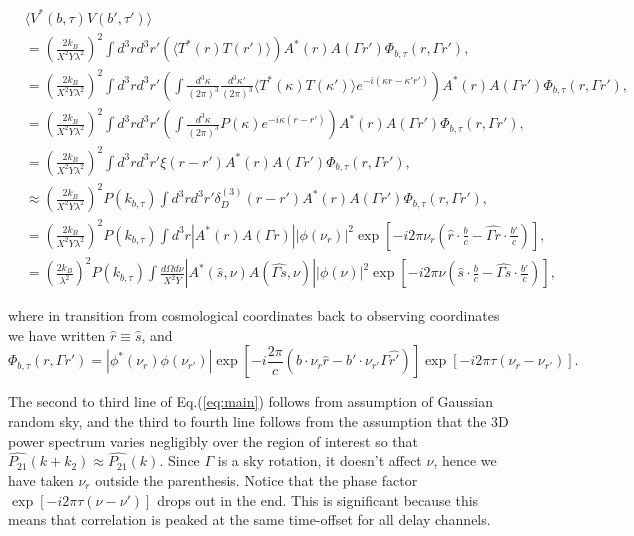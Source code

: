 \documentclass[preprint2,numberedappendix,tighten,twocolappendix]{aastex6}  %
\renewcommand\[{\begin{equation}}
\renewcommand\]{\end{equation}}
\begin{document}
\begin{widetext}
\begin{equation}
\begin{aligned} & \langle V^{*}(b,\tau)V(b',\tau')\rangle\\
 & =\left(\frac{2k_{B}}{X^{2}Y\lambda^{2}}\right)^{2}\int d^{3}rd^{3}r'\left(\langle T^{*}(r)T(r')\rangle\right)A^{*}(r)A(\Gamma r')\Phi_{b,\tau}(r,\Gamma r'),\\
 & =\left(\frac{2k_{B}}{X^{2}Y\lambda^{2}}\right)^{2}\int d^{3}rd^{3}r'\left(\int\frac{d^{3}\kappa}{(2\pi)^{3}}\frac{d^{3}\kappa'}{(2\pi)^{3}}\langle T^{*}(\kappa)T(\kappa')\rangle e^{-i(\kappa r-\kappa'r')}\right)A^{*}(r)A(\Gamma r')\Phi_{b,\tau}(r,\Gamma r'),\\
 & =\left(\frac{2k_{B}}{X^{2}Y\lambda^{2}}\right)^{2}\int d^{3}rd^{3}r'\left(\int\frac{d^{3}\kappa}{(2\pi)^{3}}P(\kappa)e^{-i\kappa(r-r')}\right)A^{*}(r)A(\Gamma r')\Phi_{b,\tau}(r,\Gamma r'),\\
 & =\left(\frac{2k_{B}}{X^{2}Y\lambda^{2}}\right)^{2}\int d^{3}rd^{3}r'\xi(r-r')A^{*}(r)A(\Gamma r')\Phi_{b,\tau}(r,\Gamma r'),\\
 & \approx\left(\frac{2k_{B}}{X^{2}Y\lambda^{2}}\right)^{2}P(k_{b,\tau})\int d^{3}rd^{3}r'\delta_{D}^{(3)}(r-r')A^{*}(r)A(\Gamma r')\Phi_{b,\tau}(r,\Gamma r'),\\
 & =\left(\frac{2k_{B}}{X^{2}Y\lambda^{2}}\right)^{2}P(k_{b,\tau})\int d^{3}r|A^{*}(r)A(\Gamma r)||\phi(\nu_{r})|^{2}\exp\left[-i2\pi\nu_{r}\left(\hat{r}\cdot\frac{b}{c}-\hat{\Gamma r}\cdot\frac{b'}{c}\right)\right],\\
 & =\left(\frac{2k_{B}}{\lambda^{2}}\right)^{2}P(k_{b,\tau})\int\frac{d\Omega d\nu}{X^{2}Y}|A^{*}(\hat{s},\nu)A(\hat{\Gamma s},\nu)||\phi(\nu)|^{2}\exp\left[-i2\pi\nu\left(\hat{s}\cdot\frac{b}{c}-\hat{\Gamma s}\cdot\frac{b'}{c}\right)\right],
\end{aligned}
\label{eq:main}
\end{equation}

where in transition from cosmological coordinates back to observing coordinates we have written $\hat{r}\equiv\hat{s}$, and 
\begin{equation}
\Phi_{b,\tau}(r,\Gamma r')=|{\phi^{*}}(\ensuremath{\nu_{r}})\phi(\nu_{r'})|\exp\left[-i\frac{2\pi}{c}\left(b\cdot\nu_{r}\hat{r}-b'\cdot\nu_{r'}\Gamma\hat{r'}\right)\right]\exp\left[-i2\pi\tau\left(\nu_{r}-\nu_{r'}\right)\right].
\end{equation}
\end{widetext}
The second to third line of Eq.(\ref{eq:main}) follows from assumption of Gaussian random
sky, and the third to fourth line follows from the assumption that
the 3D power spectrum varies negligibly over the region of interest
so that $\hat{P_{21}}(k+k_{2})\approx\hat{P_{21}}(k)$. Since $\Gamma$
is a sky rotation, it doesn't affect $\nu$, hence we have taken $\nu_{r}$
outside the parenthesis. Notice that the phase factor $\exp\left[-i2\pi\tau\left(\nu-\nu'\right)\right]$
drops out in the end. This is significant because this means that correlation is peaked at the same time-offset for all delay channels. 
\end{document}
